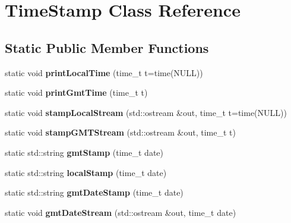 \hypertarget{classTimeStamp}{}\section{Time\+Stamp Class Reference}
\label{classTimeStamp}
\subsection*{Static Public Member Functions}
\begin{DoxyCompactItemize}
\item 
\mbox{\label{classTimeStamp_a8ec4dfa2498f47685c3f8f72b426316c}} 
static void {\bfseries print\+Local\+Time} (time\+\_\+t t=time(N\+U\+LL))
\item 
\mbox{\label{classTimeStamp_aa7c7e41c3c0b18eccf14e82893d61474}} 
static void {\bfseries print\+Gmt\+Time} (time\+\_\+t t)
\item 
\mbox{\label{classTimeStamp_af4050fd9a42f1164f08228896182c037}} 
static void {\bfseries stamp\+Local\+Stream} (std\+::ostream \&out, time\+\_\+t t=time(N\+U\+LL))
\item 
\mbox{\label{classTimeStamp_a6488a89f147c3ad756b8a1669d02e121}} 
static void {\bfseries stamp\+G\+M\+T\+Stream} (std\+::ostream \&out, time\+\_\+t t)
\item 
\mbox{\label{classTimeStamp_a0f124a90bd8126f4d4db39d8cb40bd45}} 
static std\+::string {\bfseries gmt\+Stamp} (time\+\_\+t date)
\item 
\mbox{\label{classTimeStamp_a7be3a73ce893276376f96a74e7add043}} 
static std\+::string {\bfseries local\+Stamp} (time\+\_\+t date)
\item 
\mbox{\label{classTimeStamp_aaf0342f4746a70a9833d1b2820a5cc92}} 
static std\+::string {\bfseries gmt\+Date\+Stamp} (time\+\_\+t date)
\item 
\mbox{\label{classTimeStamp_a58075740c3ec523129da01723839c409}} 
static void {\bfseries gmt\+Date\+Stream} (std\+::ostream \&out, time\+\_\+t date)
\item 
\mbox{\label{classTimeStamp_aabcdf6d992a680d9da815f0a78683e59}} 

\end{DoxyCompactItemize}
